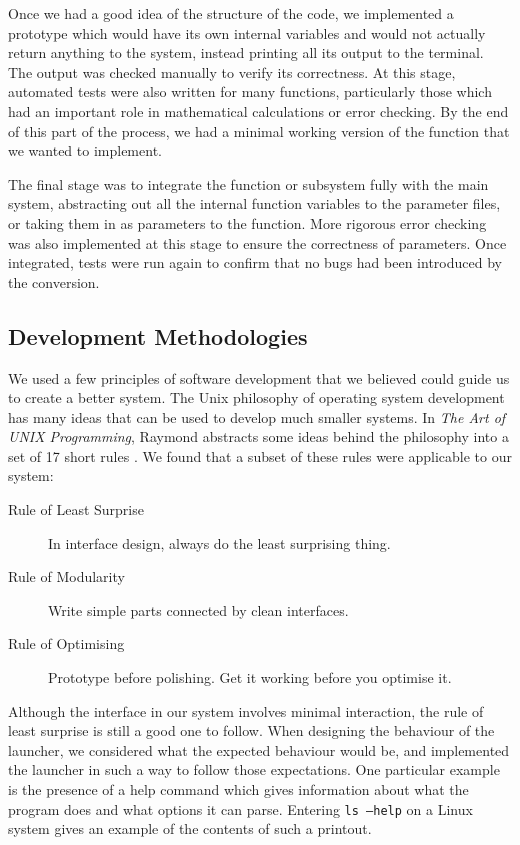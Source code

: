 \documentclass[a4paper,11pt]{article}
\begin{document}
   Once we had a good idea of the structure of the code, we implemented a
   prototype which would have its own internal variables and would not actually
   return anything to the system, instead printing all its output to the
   terminal. The output was checked manually to verify its correctness. At this
   stage, automated tests were also written for many functions, particularly
   those which had an important role in mathematical calculations or error
   checking. By the end of this part of the process, we had a minimal working
   version of the function that we wanted to implement.

   The final stage was to integrate the function or subsystem fully with the
   main system, abstracting out all the internal function variables to the
   parameter files, or taking them in as parameters to the function. More
   rigorous error checking was also implemented at this stage to ensure the
   correctness of parameters. Once integrated, tests were run again to confirm
   that no bugs had been introduced by the conversion.
\subsection{Development Methodologies}
\label{sec-7-2}

   We used a few principles of software development that we believed could guide
   us to create a better system. The Unix philosophy of operating system
   development has many ideas that can be used to develop much smaller
   systems. In \emph{The Art of UNIX Programming}, Raymond abstracts some ideas
   behind the philosophy into a set of 17 short rules \cite{artunix}. We found
   that a subset of these rules were applicable to our system:

   \begin{description}
   \item[Rule of Least Surprise] In interface design, always do the least
   surprising thing.
   \item[Rule of Modularity] Write simple parts connected by clean interfaces.
   \item[Rule of Optimising] Prototype before polishing. Get it working before
   you optimise it.
   \end{description}
   
   Although the interface in our system involves minimal interaction, the rule
   of least surprise is still a good one to follow. When designing the behaviour
   of the launcher, we considered what the expected behaviour would be, and
   implemented the launcher in such a way to follow those expectations. One
   particular example is the presence of a help command which gives information
   about what the program does and what options it can parse. Entering
   \texttt{ls --help} on a Linux system gives an example of the contents of such
   a printout.
\end{document}
